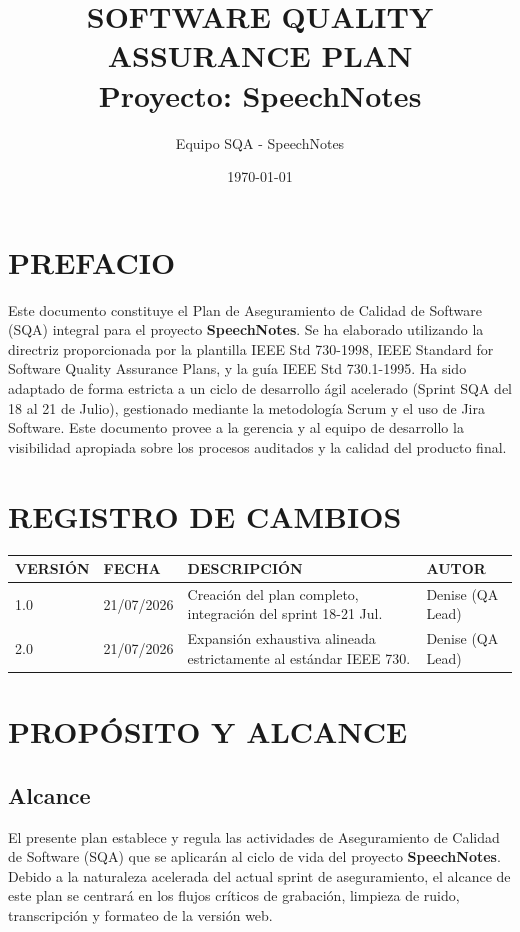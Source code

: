 \documentclass[12pt,a4paper]{article}
\title{SOFTWARE QUALITY ASSURANCE PLAN\\ \large Proyecto: SpeechNotes}
\author{Equipo SQA - SpeechNotes}
\date{\today}
\begin{document}
\maketitle
\newpage

\section*{PREFACIO}
Este documento constituye el Plan de Aseguramiento de Calidad de Software (SQA) integral para el proyecto \textbf{SpeechNotes}. Se ha elaborado utilizando la directriz proporcionada por la plantilla IEEE Std 730-1998, IEEE Standard for Software Quality Assurance Plans, y la guía IEEE Std 730.1-1995. Ha sido adaptado de forma estricta a un ciclo de desarrollo ágil acelerado (Sprint SQA del 18 al 21 de Julio), gestionado mediante la metodología Scrum y el uso de Jira Software. Este documento provee a la gerencia y al equipo de desarrollo la visibilidad apropiada sobre los procesos auditados y la calidad del producto final.

\newpage
\section*{REGISTRO DE CAMBIOS}
\begin{longtable}{p{2cm} p{2cm} p{7cm} p{3cm}}
\toprule
\textbf{VERSIÓN} & \textbf{FECHA} & \textbf{DESCRIPCIÓN} & \textbf{AUTOR} \\
\midrule
1.0 & 21/07/2026 & Creación del plan completo, integración del sprint 18-21 Jul. & Denise (QA Lead) \\
2.0 & 21/07/2026 & Expansión exhaustiva alineada estrictamente al estándar IEEE 730. & Denise (QA Lead) \\
\bottomrule
\end{longtable}

\newpage
\tableofcontents
\newpage

\section{PROPÓSITO Y ALCANCE}
\subsection{Alcance}
El presente plan establece y regula las actividades de Aseguramiento de Calidad de Software (SQA) que se aplicarán al ciclo de vida del proyecto \textbf{SpeechNotes}. Debido a la naturaleza acelerada del actual sprint de aseguramiento, el alcance de este plan se centrará en los flujos críticos de grabación, limpieza de ruido, transcripción y formateo de la versión web.
\end{document}
